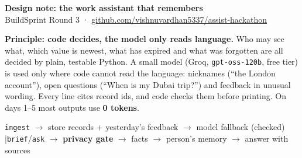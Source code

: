 \documentclass[10pt,a4paper]{article}
\newcommand{\code}[1]{\texttt{\small #1}}
\begin{document}
{\Large\bfseries Design note: the work assistant that remembers}\\[1pt]
{\color{muted}\small BuildSprint Round 3 \quad·\quad
\href{https://github.com/vishnuvardhan5337/assist-hackathon}{github.com/vishnuvardhan5337/assist-hackathon}}

\vspace{4pt}
\textbf{Principle: code decides, the model only reads language.} Who may see what, which value is newest,
what has expired and what was forgotten are all decided by plain, testable Python. A small model (Groq,
\code{gpt-oss-120b}, free tier) is used only where code cannot read the language: nicknames (``the London
account''), open questions (``When is my Dubai trip?'') and feedback in unusual wording. Every line cites
record ids, and code checks them before printing. On days 1--5 most outputs use \textbf{0 tokens}.

{\small\color{muted}\code{ingest} $\rightarrow$ store records + yesterday's feedback $\rightarrow$ model fallback (checked)
\quad|\quad \code{brief}/\code{ask} $\rightarrow$ \textbf{privacy gate} $\rightarrow$ facts $\rightarrow$ person's memory
$\rightarrow$ answer with sources}
\end{document}
